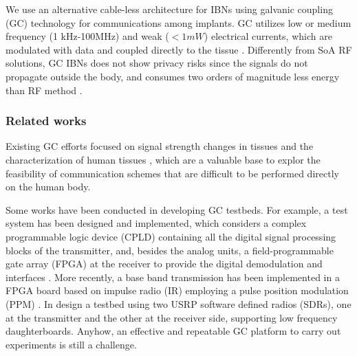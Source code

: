 We use an alternative cable-less architecture for IBNs using galvanic coupling (GC) technology for communications among implants.
GC utilizes low or medium frequency (1 kHz-100MHz) and weak ($< 1mW$) electrical
currents, which are modulated with data and coupled directly to the tissue \cite{Callejon2014}.
Differently from SoA RF solutions, GC IBNs does not show privacy risks since the signals do not propagate outside the body, and consumes two orders of magnitude less energy than RF method \cite{Swaminathan2016,Swaminathan2017}.

\subsubsection{Related works}
Existing GC efforts focused on signal strength changes in tissues \cite{Seyedi2013, Wegmueller2009, Callejon2014} and the characterization of human tissues \cite{Swaminathan2016, Seyedi2013, Wegmueller2010}, which are a valuable base to explor the feasibility of communication schemes that are difficult to be performed directly on the human body.

Some works have been conducted in developing GC testbeds.
For example, a test system has been designed and implemented, 
which considers a complex programmable logic device (CPLD) containing all the digital signal processing blocks of the transmitter, and, besides the analog units, a field-programmable gate array (FPGA) at the receiver to provide the digital demodulation and interfaces \cite{Wegmueller2009}.
More recently, a base band transmission has been implemented
in a FPGA board based on impulse radio (IR) employing a pulse position modulation (PPM) \cite{Seyedi2017}.
In \cite{Tomlinson2016} design a testbed using two USRP software defined radios (SDRs), one at the transmitter and the other at the receiver side, supporting  low frequency daughterboards.
Anyhow, an effective and repeatable GC platform to carry out experiments is still a challenge. 

